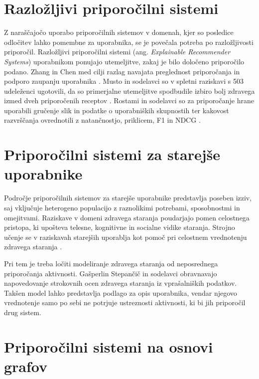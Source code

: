 \documentclass[a4paper,twoside,openright,12pt,slovene]{book}
\begin{document}
\section{Razložljivi priporočilni sistemi}
\label{sec:sota_xrs}

Z naraščajočo uporabo priporočilnih sistemov v domenah, kjer so posledice odločitev lahko pomembne za uporabnika, se je povečala potreba po razložljivosti priporočil. Razložljivi priporočilni sistemi (ang. \textit{Explainable Recommender Systems}) uporabnikom ponujajo utemeljitve, zakaj je bilo določeno priporočilo podano. Zhang in Chen med cilji razlag navajata preglednost priporočanja in podporo zaupanju uporabnika \cite{zhang2020explainable}. Musto in sodelavci so v spletni raziskavi s 503 udeleženci ugotovili, da so primerjalne utemeljitve spodbudile izbiro bolj zdravega izmed dveh priporočenih receptov \cite{musto2021justifications}. Rostami in sodelavci so za priporočanje hrane uporabili gručenje slik in podatke o uporabniških skupnostih ter kakovost razvrščanja ovrednotili z natančnostjo, priklicem, F1 in NDCG \cite{rostami2022food}.

\section{Priporočilni sistemi za starejše uporabnike}
\label{sec:sota_elderly}

Področje priporočilnih sistemov za starejše uporabnike predstavlja poseben izziv, saj vključuje heterogeno populacijo z raznolikimi potrebami, sposobnostmi in omejitvami. Raziskave v domeni zdravega staranja poudarjajo pomen celostnega pristopa, ki upošteva telesne, kognitivne in socialne vidike staranja. Strojno učenje se v raziskavah starejših uporablja kot pomoč pri celostnem vrednotenju zdravega staranja \cite{gasperlin2024healthyageing}.

Pri tem je treba ločiti modeliranje zdravega staranja
od neposrednega priporočanja aktivnosti.
Gašperlin Stepančič in sodelavci
\cite{gasperlin2024healthyageing} obravnavajo
napovedovanje strokovnih ocen zdravega staranja
iz vprašalniških podatkov. Takšen model lahko
predstavlja podlago za opis uporabnika, vendar
njegovo vrednotenje samo po sebi ne potrjuje
ustreznosti aktivnosti, ki bi jih priporočil
drug sistem.

\section{Priporočilni sistemi na osnovi grafov}
\label{sec:sota_graphs}
\end{document}
